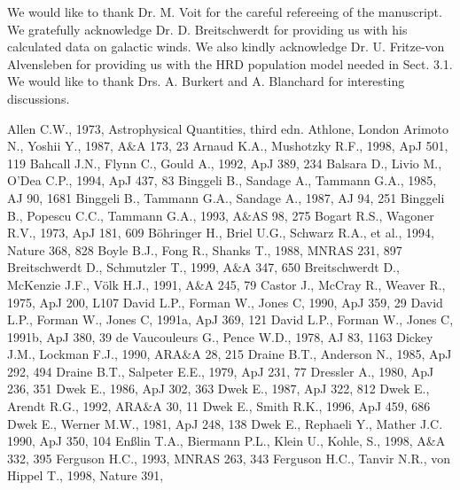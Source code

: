 \documentclass[]{aa}
\begin{document}
\acknowledgements

We would like to thank Dr. M. Voit for the careful refereeing of the manuscript.
We gratefully acknowledge Dr. D. Breitschwerdt for providing us with his 
calculated data on galactic winds. We also kindly acknowledge Dr. U. Fritze-von
Alvensleben for providing us with the HRD population model needed in Sect.
3.1. We would like to thank Drs. A. Burkert and A. Blanchard for interesting 
discussions.
 
\begin{thebibliography}{}
\bibitem{} Allen C.W., 1973, Astrophysical Quantities, third edn. Athlone,
London 
\bibitem{} Arimoto N., Yoshii Y., 1987, A$\&$A 173, 23
\bibitem{} Arnaud K.A., Mushotzky R.F., 1998, ApJ 501, 119
\bibitem{} Bahcall J.N., Flynn C., Gould A., 1992, ApJ 389, 234
\bibitem{} Balsara D., Livio M., O'Dea C.P., 1994, ApJ 437, 83
\bibitem{} Binggeli B., Sandage A., Tammann G.A., 1985, AJ 90, 1681
\bibitem{} Binggeli B., Tammann G.A., Sandage A., 1987, AJ 94, 251
\bibitem{} Binggeli B., Popescu C.C., Tammann G.A., 1993, A$\&$AS 98, 275
\bibitem{} Bogart R.S., Wagoner R.V., 1973, ApJ 181, 609
\bibitem{} B\"ohringer H., Briel U.G., Schwarz R.A., et al., 1994, Nature 368, 
828
\bibitem{} Boyle B.J., Fong R., Shanks T., 1988, MNRAS 231, 897
\bibitem{} Breitschwerdt D., Schmutzler T., 1999, A$\&$A 347, 650
\bibitem{} Breitschwerdt D., McKenzie J.F., V\"olk H.J., 1991, A$\&$A 245, 79 
\bibitem{} Castor J., McCray R., Weaver R., 1975, ApJ 200, L107
\bibitem{} David L.P., Forman W., Jones C, 1990, ApJ 359, 29
\bibitem{} David L.P., Forman W., Jones C, 1991a, ApJ 369, 121
\bibitem{} David L.P., Forman W., Jones C, 1991b, ApJ 380, 39
\bibitem{} de Vaucouleurs G., Pence W.D., 1978, AJ 83, 1163 
\bibitem{} Dickey J.M., Lockman F.J., 1990, ARA\&A 28, 215
\bibitem{} Draine B.T., Anderson N., 1985, ApJ 292, 494
\bibitem{} Draine B.T., Salpeter E.E., 1979, ApJ 231, 77
\bibitem{} Dressler A., 1980, ApJ 236, 351
\bibitem{} Dwek E., 1986, ApJ 302, 363
\bibitem{} Dwek E., 1987, ApJ 322, 812
\bibitem{} Dwek E., Arendt R.G., 1992, ARA\&A 30, 11
\bibitem{} Dwek E., Smith R.K., 1996, ApJ 459, 686
\bibitem{} Dwek E., Werner M.W., 1981, ApJ 248, 138
\bibitem{} Dwek E., Rephaeli Y., Mather J.C. 1990, ApJ 350, 104
\bibitem{} En{\ss}lin T.A., Biermann P.L., Klein U., Kohle, S., 1998, A\&A
332, 395
\bibitem{} Ferguson H.C., 1993, MNRAS 263, 343
\bibitem{} Ferguson H.C., Tanvir N.R., von Hippel T., 1998, Nature 391, 

\end{thebibliography}
\end{document}
